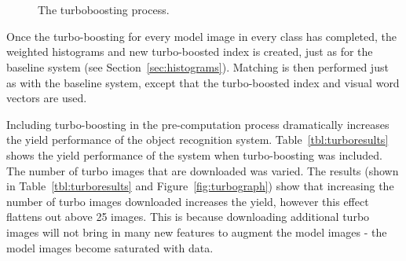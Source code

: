 \documentclass[11pt, onecolumn, a4paper, final]{report} %
\begin{document}
\begin{figure}[htb]
\\
\\
\caption{The turboboosting process.}
\label{fig:turboboosting}
\end{figure}

\clearpage



Once the turbo-boosting for every model image in every class has completed, the weighted histograms and new turbo-boosted index is created, just as for the baseline system (see Section~\ref{sec:histograms}). Matching is then performed just as with the baseline system, except that the turbo-boosted index and visual word vectors are used.

Including turbo-boosting in the pre-computation process dramatically increases the yield performance of the object recognition system. Table~\ref{tbl:turboresults} shows the yield performance of the system when turbo-boosting was included. The number of turbo images that are downloaded was varied. The results (shown in Table~\ref{tbl:turboresults} and Figure~\ref{fig:turbograph}) show that increasing the number of turbo images downloaded increases the yield, however this effect flattens out above 25 images. This is because downloading additional turbo images will not bring in many new features to augment the model images - the model images become saturated with data.
\end{document}
